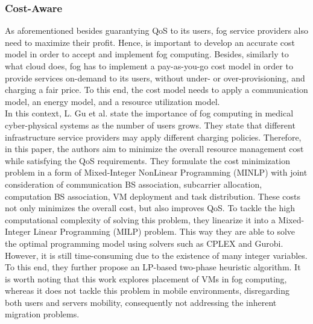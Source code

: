 \subsubsection{Cost-Aware}\label{sec:cost}
\noindent As aforementioned besides guarantying QoS to its users, fog service providers also need to maximize their profit. Hence, is important to develop an accurate cost model in order to accept and implement fog computing. Besides, similarly to what cloud does, fog has to implement a pay-as-you-go cost model in order to provide services on-demand to its users, without under- or over-provisioning, and charging a fair price. To this end, the cost model needs to apply a communication model, an energy model, and a resource utilization model.\\
\noindent\tab In this context, L. Gu et al. \cite{gu2017cost} state the importance of fog computing in medical cyber-physical systems as the number of users grows. They state that different infrastructure service providers may apply different charging policies. Therefore, in this paper, the authors aim to minimize the overall resource management cost while satisfying the QoS requirements. They formulate the cost minimization problem in a form of Mixed-Integer NonLinear Programming (MINLP) with joint consideration of communication BS association, subcarrier allocation, computation BS association, VM deployment and task distribution. These costs not only minimizes the overall cost, but also improves QoS. To tackle the high computational complexity of solving this problem, they linearize it into a Mixed-Integer Linear Programming (MILP) problem. This way they are able to solve the optimal programming model using solvers such as CPLEX and Gurobi. However, it is still time-consuming due to the existence of many integer variables. To this end, they further propose an LP-based two-phase heuristic algorithm. It is worth noting that this work explores placement of VMs in fog computing, whereas it does not tackle this problem in mobile environments, disregarding both users and servers mobility, consequently not addressing the inherent migration problems.\\ %
